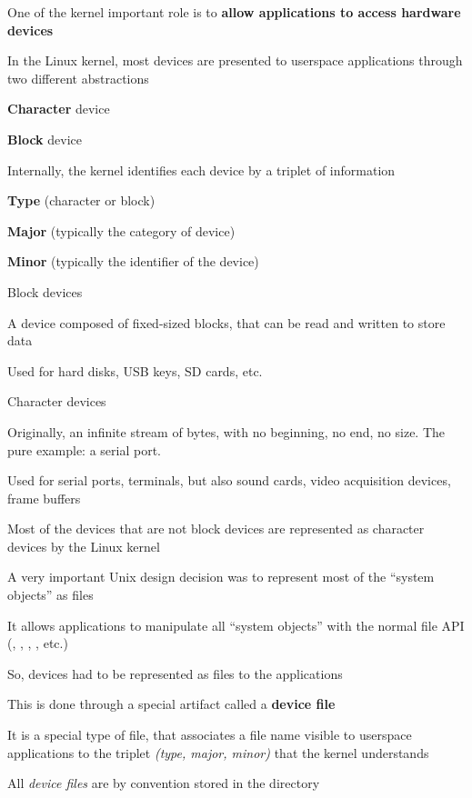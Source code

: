   \startitemize
  \item One of the kernel important role is to {\bf allow applications
      to access hardware devices}
  \item In the Linux kernel, most devices are presented to userspace
    applications through two different abstractions
    \startitemize
    \item {\bf Character} device
    \item {\bf Block} device
    \stopitemize
  \item Internally, the kernel identifies each device by a triplet of
    information
    \startitemize
    \item {\bf Type} (character or block)
    \item {\bf Major} (typically the category of device)
    \item {\bf Minor} (typically the identifier of the device)
    \stopitemize
  \stopitemize

  \startitemize
  \item Block devices
    \startitemize
    \item A device composed of fixed-sized blocks, that can be read
      and written to store data
    \item Used for hard disks, USB keys, SD cards, etc.
    \stopitemize
  \item Character devices
    \startitemize
    \item Originally, an infinite stream of bytes, with no beginning,
      no end, no size. The pure example: a serial port.
    \item Used for serial ports, terminals, but also sound cards,
      video acquisition devices, frame buffers
    \item Most of the devices that are not block devices are
      represented as character devices by the Linux kernel
    \stopitemize
  \stopitemize

  \startitemize
  \item A very important Unix design decision was to represent most of
    the ``system objects'' as files
  \item It allows applications to manipulate all “system objects” with
    the normal file API (, , ,
    , etc.)
  \item So, devices had to be represented as files to the applications
  \item This is done through a special artifact called a {\bf device
      file}
  \item It is a special type of file, that associates a file name
    visible to userspace applications to the triplet {\em (type,
      major, minor)} that the kernel understands
  \item All {\em device files} are by convention stored in the
     directory
  \stopitemize


